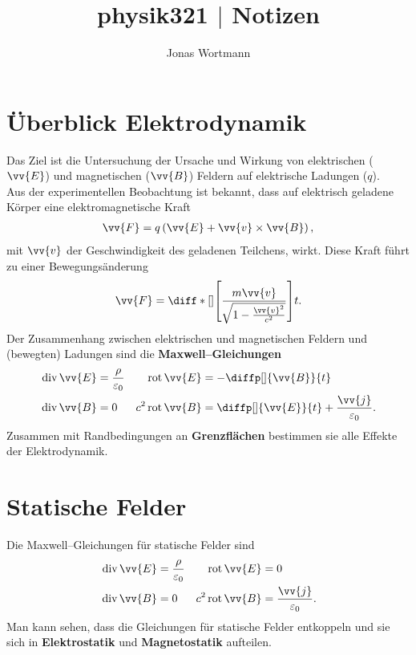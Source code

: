 \documentclass[a4paper,12pt]{article}
\numberwithin{equation}{section}
\begin{document}

\title{physik321 $|$ Notizen}
\author{Jonas Wortmann}
\maketitle
{}


\newpage


\fancyhead[L]{\thepage}
\fancyfoot[C]{}

\tableofcontents


\newpage


\fancyhead[R]{\leftmark\\\rightmark}

\section{Überblick Elektrodynamik}
Das Ziel ist die Untersuchung der Ursache und Wirkung von elektrischen ($\vv{E}$) und magnetischen ($\vv{B}$) Feldern auf elektrische Ladungen ($q$).\\\indent
Aus der experimentellen Beobachtung ist bekannt, dass auf elektrisch geladene Körper eine elektromagnetische Kraft 
\begin{align} 
        \vv{F}=q\left(\vv{E}+\vv{v}\times \vv{B}\right)
,\end{align} 
mit $\vv{v}$ der Geschwindigkeit des geladenen Teilchens, wirkt. Diese Kraft führt zu einer Bewegungsänderung
\begin{align} 
        \vv{F}=\diff*[]{\left[\dfrac{m\vv{v}}{\,\sqrt[]{1-\tfrac{\vv{v}^2}{c^2}} }\right]}{t}
.\end{align} 
Der Zusammenhang zwischen elektrischen und magnetischen Feldern und (bewegten) Ladungen sind die \textbf{Maxwell--Gleichungen}
\begin{align} 
        \,\text{div}\,\vv{E}&=\dfrac{\rho }{\varepsilon _0}&\,\text{rot}\,\vv{E}&=-\diffp[]{\vv{B}}{t}\\
        \,\text{div}\,\vv{B}&=0&c^2\,\text{rot}\,\vv{B}&=\diffp[]{\vv{E}}{t}+\dfrac{\vv{j}}{\varepsilon _0}
.\end{align} 
Zusammen mit Randbedingungen an \textbf{Grenzflächen} bestimmen sie alle Effekte der Elektrodynamik.

\newpage
\section{Statische Felder}
Die Maxwell--Gleichungen für statische Felder sind
\begin{align} 
        \,\text{div}\,\vv{E}&=\dfrac{\rho }{\varepsilon _0}&\,\text{rot}\,\vv{E}&=0\\
        \,\text{div}\,\vv{B}&=0&c^2\,\text{rot}\,\vv{B}&=\dfrac{\vv{j}}{\varepsilon _0}
.\end{align} 
Man kann sehen, dass die Gleichungen für statische Felder entkoppeln und sie sich in \textbf{Elektrostatik} und \textbf{Magnetostatik} aufteilen.
\end{document}
